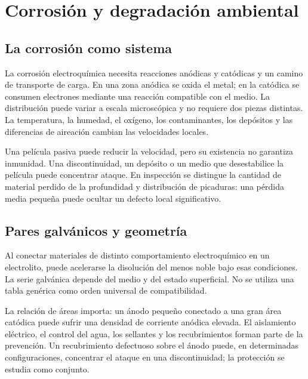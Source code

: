 \chapter{Corrosión y degradación ambiental}\label{ch:06}
\section{La corrosión como sistema}
La corrosión electroquímica necesita reacciones anódicas y catódicas y un camino de transporte de carga. En una zona anódica se oxida el metal; en la catódica se consumen electrones mediante una reacción compatible con el medio. La distribución puede variar a escala microscópica y no requiere dos piezas distintas. La temperatura, la humedad, el oxígeno, los contaminantes, los depósitos y las diferencias de aireación cambian las velocidades locales.

Una película pasiva puede reducir la velocidad, pero su existencia no garantiza inmunidad. Una discontinuidad, un depósito o un medio que desestabilice la película puede concentrar ataque. En inspección se distingue la cantidad de material perdido de la profundidad y distribución de picaduras: una pérdida media pequeña puede ocultar un defecto local significativo.
\section{Pares galvánicos y geometría}
Al conectar materiales de distinto comportamiento electroquímico en un electrolito, puede acelerarse la disolución del menos noble bajo esas condiciones. La serie galvánica depende del medio y del estado superficial. No se utiliza una tabla genérica como orden universal de compatibilidad.

La relación de áreas importa: un ánodo pequeño conectado a una gran área catódica puede sufrir una densidad de corriente anódica elevada. El aislamiento eléctrico, el control del agua, los sellantes y los recubrimientos forman parte de la prevención. Un recubrimiento defectuoso sobre el ánodo puede, en determinadas configuraciones, concentrar el ataque en una discontinuidad; la protección se estudia como conjunto.
